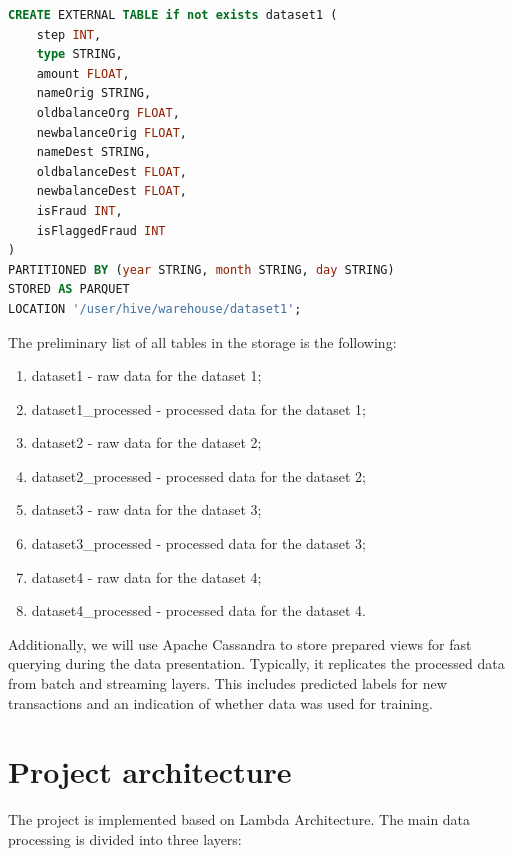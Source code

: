 \documentclass[12pt,a4paper, hidelinks]{article}
\begin{document}
\begin{lstlisting}[language=SQL, caption=Apache Hive table creation]
CREATE EXTERNAL TABLE if not exists dataset1 (
    step INT,
    type STRING,
    amount FLOAT,
    nameOrig STRING,
    oldbalanceOrg FLOAT,
    newbalanceOrig FLOAT,
    nameDest STRING,
    oldbalanceDest FLOAT,
    newbalanceDest FLOAT,
    isFraud INT,
    isFlaggedFraud INT
)
PARTITIONED BY (year STRING, month STRING, day STRING)
STORED AS PARQUET
LOCATION '/user/hive/warehouse/dataset1';
\end{lstlisting}

The preliminary list of all tables in the storage is the following:

\begin{enumerate}
    \item dataset1 - raw data for the dataset 1;
    \item dataset1\_processed - processed data for the dataset 1;
    \item dataset2 - raw data for the dataset 2;
    \item dataset2\_processed - processed data for the dataset 2;
    \item dataset3 - raw data for the dataset 3;
    \item dataset3\_processed - processed data for the dataset 3;
    \item dataset4 - raw data for the dataset 4;
    \item dataset4\_processed - processed data for the dataset 4.
\end{enumerate}

Additionally, we will use Apache Cassandra to store prepared views for fast querying during the data presentation. Typically, it replicates the processed data from batch and streaming layers. This includes predicted labels for new transactions and an indication of whether data was used for training.


\section{Project architecture}

The project is implemented based on Lambda Architecture. The main data processing is divided into three layers:
\end{document}
